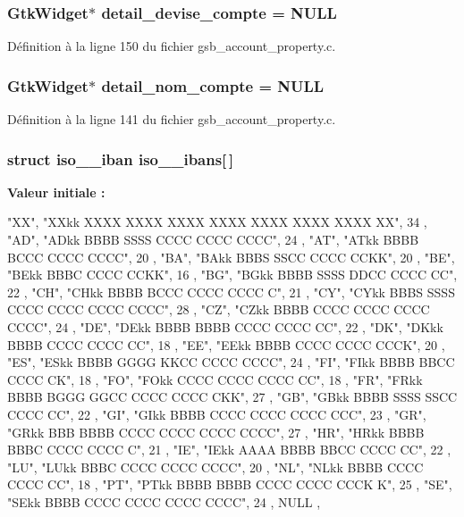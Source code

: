 \subsubsection[{detail\_\-devise\_\-compte}]{\setlength{\rightskip}{0pt plus 5cm}GtkWidget$\ast$ {\bf detail\_\-devise\_\-compte} = NULL}\label{gsb__account__property_8c_a41f9865652dc0c67db2dae5b516b18e6}


Définition à la ligne 150 du fichier gsb\_\-account\_\-property.c.

\subsubsection[{detail\_\-nom\_\-compte}]{\setlength{\rightskip}{0pt plus 5cm}GtkWidget$\ast$ {\bf detail\_\-nom\_\-compte} = NULL}\label{gsb__account__property_8c_ab50d39aa9c7ad4a81407017d1fc060d1}


Définition à la ligne 141 du fichier gsb\_\-account\_\-property.c.

\subsubsection[{iso\_\-13616\_\-ibans}]{\setlength{\rightskip}{0pt plus 5cm}struct {\bf iso\_\_\-iban} {\bf iso\_\_\-ibans}[$\,$]}\label{gsb__account__property_8c_aa56cb801e9f7d0894589a4d6962be2c7}
{\bfseries Valeur initiale :}
\begin{DoxyCode}
 {
    { "XX", "XXkk XXXX XXXX XXXX XXXX XXXX XXXX XXXX XX", 34 },
    { "AD", "ADkk BBBB SSSS CCCC CCCC CCCC", 24 },
    { "AT", "ATkk BBBB BCCC CCCC CCCC", 20 },
    { "BA", "BAkk BBBS SSCC CCCC CCKK", 20 },
    { "BE", "BEkk BBBC CCCC CCKK", 16 },
    { "BG", "BGkk BBBB SSSS DDCC CCCC CC", 22 },
    { "CH", "CHkk BBBB BCCC CCCC CCCC C", 21 },
    { "CY", "CYkk BBBS SSSS CCCC CCCC CCCC CCCC", 28 },
    { "CZ", "CZkk BBBB CCCC CCCC CCCC CCCC", 24 },
    { "DE", "DEkk BBBB BBBB CCCC CCCC CC", 22 },
    { "DK", "DKkk BBBB CCCC CCCC CC", 18 },
    { "EE", "EEkk BBBB CCCC CCCC CCCK", 20 },
    { "ES", "ESkk BBBB GGGG KKCC CCCC CCCC", 24 },
    { "FI", "FIkk BBBB BBCC CCCC CK", 18 },
    { "FO", "FOkk CCCC CCCC CCCC CC", 18 },
    { "FR", "FRkk BBBB BGGG GGCC CCCC CCCC CKK", 27 },
    { "GB", "GBkk BBBB SSSS SSCC CCCC CC", 22 },
    { "GI", "GIkk BBBB CCCC CCCC CCCC CCC", 23 },
    { "GR", "GRkk BBB BBBB CCCC CCCC CCCC CCCC", 27 },
    { "HR", "HRkk BBBB BBBC CCCC CCCC C", 21 },
    { "IE", "IEkk AAAA BBBB BBCC CCCC CC", 22 },
    { "LU", "LUkk BBBC CCCC CCCC CCCC", 20 },
    { "NL", "NLkk BBBB CCCC CCCC CC", 18 },
    { "PT", "PTkk BBBB BBBB CCCC CCCC CCCK K", 25 },
    { "SE", "SEkk BBBB CCCC CCCC CCCC CCCC", 24 },
    { NULL },
}
\end{DoxyCode}


